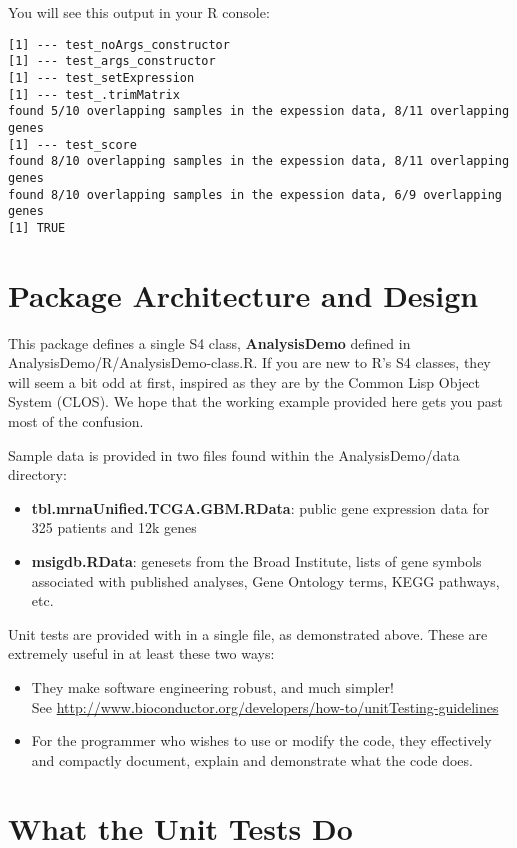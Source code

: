 \documentclass{article}
\begin{document}
You will see this output in your R console:


\begin{verbatim}
[1] --- test_noArgs_constructor
[1] --- test_args_constructor
[1] --- test_setExpression
[1] --- test_.trimMatrix
found 5/10 overlapping samples in the expession data, 8/11 overlapping genes
[1] --- test_score
found 8/10 overlapping samples in the expession data, 8/11 overlapping genes
found 8/10 overlapping samples in the expession data, 6/9 overlapping genes
[1] TRUE
\end{verbatim}

\section{Package Architecture and Design}

This package defines a single S4 class, \textbf{AnalysisDemo} defined in AnalysisDemo/R/AnalysisDemo-class.R.
If you are new to R's S4 classes, they will seem a bit odd at first, inspired as they are by the Common Lisp
Object System (CLOS).  We hope that the working example provided here gets you past most of the confusion.

Sample data is provided in two files found within the AnalysisDemo/data directory:

\begin{itemize}
    \item \textbf{tbl.mrnaUnified.TCGA.GBM.RData}: public gene expression data for 325 patients and 12k genes
    \item  \textbf{msigdb.RData}:  genesets from the Broad Institute, lists of gene symbols associated with
published analyses, Gene Ontology terms, KEGG pathways, etc.
\end{itemize}

Unit tests are provided with in a single file, as demonstrated above.  These are extremely useful in at least these two
ways:

\begin{itemize}
    \item They make software engineering robust, and much simpler! \\ See \url{http://www.bioconductor.org/developers/how-to/unitTesting-guidelines}
    \item For the programmer who wishes to use or modify the code, they effectively and compactly document, explain and demonstrate what the code does.
\end{itemize}

\section{What the Unit Tests Do}
\end{document}
